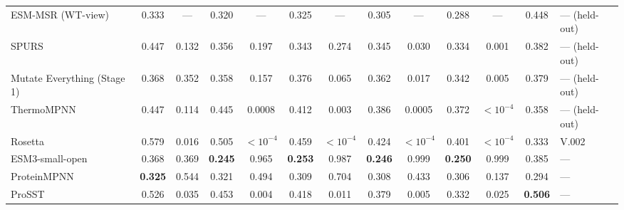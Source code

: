 \begin{table}[H]
{\begin{tabular}{lcccccccccccl}
ESM-MSR (WT-view) & 0.333 & --- & 0.320 & --- & 0.325 & --- & 0.305 & --- & 0.288 & --- & 0.448 & --- (held-out) \\
SPURS & 0.447 & 0.132 & 0.356 & 0.197 & 0.343 & 0.274 & 0.345 & 0.030 & 0.334 & 0.001 & 0.382 & --- (held-out) \\
Mutate Everything (Stage 1) & 0.368 & 0.352 & 0.358 & 0.157 & 0.376 & 0.065 & 0.362 & 0.017 & 0.342 & 0.005 & 0.379 & --- (held-out) \\
ThermoMPNN & 0.447 & 0.114 & 0.445 & 0.0008 & 0.412 & 0.003 & 0.386 & 0.0005 & 0.372 & $<10^{-4}$ & 0.358 & --- (held-out) \\
Rosetta & 0.579 & 0.016 & 0.505 & $<10^{-4}$ & 0.459 & $<10^{-4}$ & 0.424 & $<10^{-4}$ & 0.401 & $<10^{-4}$ & 0.333 & V.002 \\
ESM3-small-open & 0.368 & 0.369 & \textbf{0.245} & 0.965 & \textbf{0.253} & 0.987 & \textbf{0.246} & 0.999 & \textbf{0.250} & 0.999 & 0.385 & --- \\
ProteinMPNN & \textbf{0.325} & 0.544 & 0.321 & 0.494 & 0.309 & 0.704 & 0.308 & 0.433 & 0.306 & 0.137 & 0.294 & --- \\
ProSST & 0.526 & 0.035 & 0.453 & 0.004 & 0.418 & 0.011 & 0.379 & 0.005 & 0.332 & 0.025 & \textbf{0.506} & --- \\
\bottomrule
\end{tabular}
}
\end{table}

